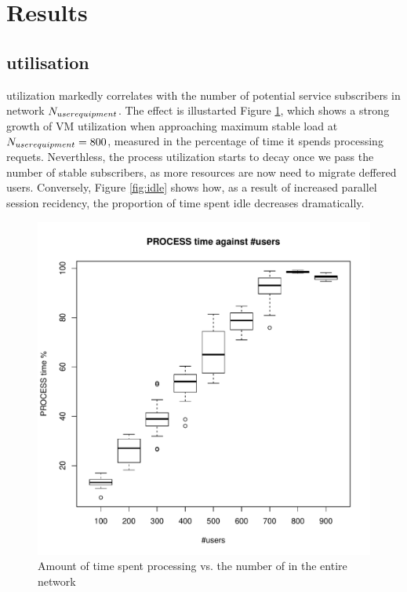 \section{Results}
\label{sec:results}

\subsection{\Dc utilisation}
\Dc utilization markedly correlates with the number of potential service subscribers in network $N_{user equipment}$. The effect is illustarted Figure \ref{fig:process}, which shows a strong growth of VM utilization when approaching maximum stable load at $N_{user equipment}=800$, measured in the percentage of time it spends processing requets. Neverthless, the process utilization starts to decay once we pass the number of stable subscribers, as more resources are now need to migrate deffered users. Conversely, Figure \ref{fig:idle} shows how, as a result of increased parallel session recidency, the proportion of time spent idle decreases dramatically.

\begin{figure}[tb]
	\centering
	\includegraphics[width=\linewidth]{PROCESS.pdf} 
	\caption{Amount of time spent processing vs. the number of \ues in the entire network}
	\label{fig:process}
\end{figure}


